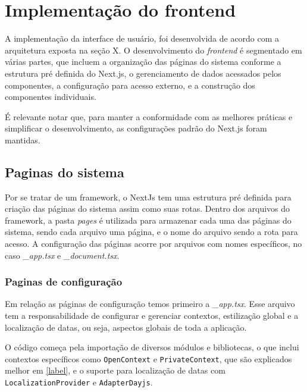 \section[Implementação do frontend]{Implementação do frontend}
A implementação da interface de usuário, foi desenvolvida de acordo com a arquitetura exposta na seção X. O desenvolvimento do \textit{frontend} é segmentado em várias partes, que incluem a organização das páginas do sistema conforme a estrutura pré definida do Next.js, o gerenciamento de dados acessados pelos componentes, a configuração para acesso externo, e a construção dos componentes individuais.

É relevante notar que, para manter a conformidade com as melhores práticas e simplificar o desenvolvimento, as configurações padrão do Next.js foram mantidas.

\subsection{Paginas do sistema}\label{subsec:}
Por se tratar de um framework, o NextJs tem uma estrutura pré definida para criação das páginas do sistema assim como suas rotas. Dentro dos arquivos do framework, a pasta \textit{pages} é utilizada para armazenar cada uma das páginas do sistema, sendo cada arquivo uma página, e o nome do arquivo sendo a rota para acesso. A configuração das páginas acorre por arquivos com nomes específicos, no caso \textit{\_app.tsx} e \textit{\_document.tsx}.

\subsubsection{Paginas de configuração}\label{subsec:configPage}
Em relação as páginas de configuração temos primeiro a \textit{\_app.tsx}. Esse arquivo tem a responsabilidade de configurar e gerenciar contextos, estilização global e a localização de datas, ou seja, aspectos globais de toda a aplicação.

O código começa pela importação de diversos módulos e bibliotecas, o que inclui contextos específicos como \texttt{OpenContext} e \texttt{PrivateContext}, que são explicados melhor em \ref{label}, e o suporte para localização de datas com \texttt{LocalizationProvider} e \texttt{AdapterDayjs}.

